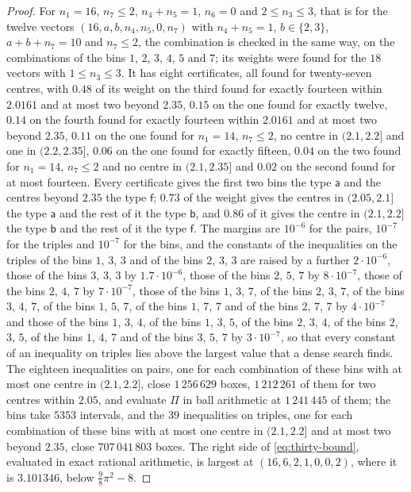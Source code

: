 \documentclass[11pt,reqno]{amsart}
\renewcommand{\_}{\origunderscore\allowbreak}
\numberwithin{equation}{section}
\theoremstyle{plain}
\theoremstyle{definition}
\theoremstyle{remark}
\begin{document}
\begin{proof}
For $n_1=16$, $n_7\le2$, $n_4+n_5=1$, $n_6=0$ and $2\le n_3\le3$, that is
for the twelve vectors $(16,a,b,n_4,n_5,0,n_7)$ with $n_4+n_5=1$,
$b\in\{2,3\}$, $a+b+n_7=10$ and $n_7\le2$, the combination is checked in
the same way, on the combinations of the bins $1$, $2$, $3$, $4$, $5$ and
$7$; its weights were found for the $18$ vectors with $1\le n_3\le3$. It
has eight certificates, all found for twenty-seven centres, with $0.48$
of its weight on the third found for exactly fourteen within $2.0161$ and
at most two beyond $2.35$, $0.15$ on the one found for exactly twelve,
$0.14$ on the fourth found for exactly fourteen within $2.0161$ and at most
two beyond $2.35$, $0.11$ on the one found for $n_1=14$, $n_7\le2$, no
centre in $(2.1,2.2]$ and one in $(2.2,2.35]$, $0.06$ on the one found
for exactly fifteen, $0.04$ on the two found for $n_1=14$, $n_7\le2$ and
no centre in $(2.1,2.35]$ and $0.02$ on the second found for at most
fourteen. Every certificate gives the first two bins the type $\mathsf a$
and the centres beyond $2.35$ the type $\mathsf f$; $0.73$ of the weight
gives the centres in $(2.05,2.1]$ the type $\mathsf a$ and the rest of it
the type $\mathsf b$, and $0.86$ of it gives the centre in $(2.1,2.2]$ the
type $\mathsf b$ and the rest of it the type $\mathsf f$. The margins are
$10^{-6}$ for the pairs, $10^{-7}$ for the triples and $10^{-7}$ for the
bins, and the constants of the inequalities on the triples of the bins
$1$, $3$, $3$ and of the bins $2$, $3$, $3$ are raised by a further
$2\cdot10^{-6}$, those of the bins $3$, $3$, $3$ by $1.7\cdot10^{-6}$,
those of the bins $2$, $5$, $7$ by $8\cdot10^{-7}$, those of the bins $2$,
$4$, $7$ by $7\cdot10^{-7}$, those of the bins $1$, $3$, $7$, of the bins
$2$, $3$, $7$, of the bins $3$, $4$, $7$, of the bins $1$, $5$, $7$, of the
bins $1$, $7$, $7$ and of the bins $2$, $7$, $7$ by $4\cdot10^{-7}$ and
those of the bins $1$, $3$, $4$, of the bins $1$, $3$, $5$, of the bins
$2$, $3$, $4$, of the bins $2$, $3$, $5$, of the bins $1$, $4$, $7$ and of
the bins $3$, $5$, $7$ by $3\cdot10^{-7}$, so that every constant of an
inequality on triples lies above the largest value that a dense search
finds. The eighteen inequalities on pairs, one for each combination of
these bins with at most one centre in $(2.1,2.2]$, close $1\,256\,629$
boxes, $1\,212\,261$ of them for two centres within $2.05$, and evaluate
$\Pi$ in ball arithmetic at $1\,241\,445$ of them; the bins take $5353$
intervals, and the $39$ inequalities on triples, one for each combination
of these bins with at most one centre in $(2.1,2.2]$ and at most two
beyond $2.35$, close $707\,041\,803$ boxes. The right side of
\eqref{eq:thirty-bound}, evaluated in exact rational arithmetic, is
largest at $(16,6,2,1,0,0,2)$, where it is $3.101346$, below
$\frac98\pi^2-8$.


\end{proof}
\end{document}
